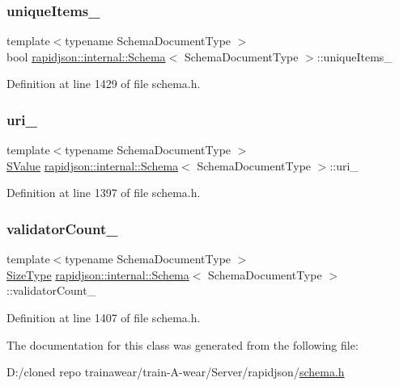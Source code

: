 \subsubsection{\texorpdfstring{uniqueItems\_}{uniqueItems\_}}
{\footnotesize\ttfamily template$<$typename Schema\+Document\+Type $>$ \\
bool \mbox{\hyperlink{classrapidjson_1_1internal_1_1_schema}{rapidjson\+::internal\+::\+Schema}}$<$ Schema\+Document\+Type $>$\+::unique\+Items\+\_\+\hspace{0.3cm}{\ttfamily [private]}}



Definition at line 1429 of file schema.\+h.

\mbox{\label{classrapidjson_1_1internal_1_1_schema_ad6fedccc1a341e973f6ea457e4f1d9a8}} 
\subsubsection{\texorpdfstring{uri\_}{uri\_}}
{\footnotesize\ttfamily template$<$typename Schema\+Document\+Type $>$ \\
\mbox{\hyperlink{classrapidjson_1_1internal_1_1_schema_a9f716b06fc542c4cdb7d8d5cf463bf79}{S\+Value}} \mbox{\hyperlink{classrapidjson_1_1internal_1_1_schema}{rapidjson\+::internal\+::\+Schema}}$<$ Schema\+Document\+Type $>$\+::uri\+\_\+\hspace{0.3cm}{\ttfamily [private]}}



Definition at line 1397 of file schema.\+h.

\mbox{\label{classrapidjson_1_1internal_1_1_schema_ad1499617f1d88331e63111647be2c767}} 
\subsubsection{\texorpdfstring{validatorCount\_}{validatorCount\_}}
{\footnotesize\ttfamily template$<$typename Schema\+Document\+Type $>$ \\
\mbox{\hyperlink{namespacerapidjson_a44eb33eaa523e36d466b1ced64b85c84}{Size\+Type}} \mbox{\hyperlink{classrapidjson_1_1internal_1_1_schema}{rapidjson\+::internal\+::\+Schema}}$<$ Schema\+Document\+Type $>$\+::validator\+Count\+\_\+\hspace{0.3cm}{\ttfamily [private]}}



Definition at line 1407 of file schema.\+h.



The documentation for this class was generated from the following file\+:\begin{DoxyCompactItemize}
\item 
D\+:/cloned repo trainawear/train-\/\+A-\/wear/\+Server/rapidjson/\mbox{\hyperlink{schema_8h}{schema.\+h}}\end{DoxyCompactItemize}
